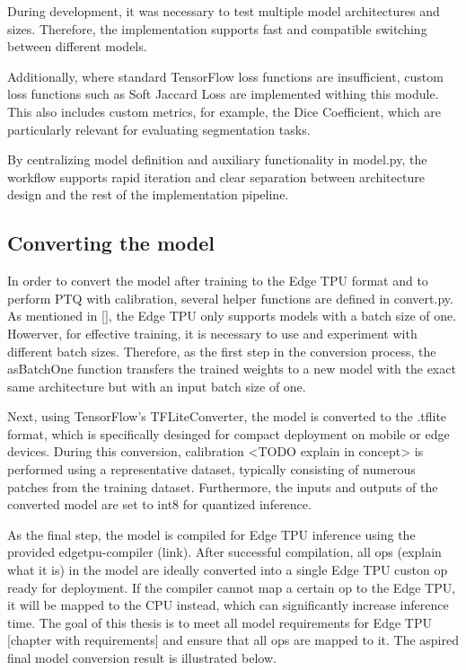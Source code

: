 {During development, it was necessary to test multiple model architectures and sizes. Therefore, the implementation supports fast and compatible switching between different models.

Additionally, where standard TensorFlow loss functions are insufficient, custom loss functions such as Soft Jaccard Loss are implemented withing this module. This also includes custom metrics, for example, the Dice Coefficient, which are particularly relevant for evaluating segmentation tasks.

By centralizing model definition and auxiliary functionality in model.py, the workflow supports rapid iteration and clear separation between architecture design and the rest of the implementation pipeline.


\subsection{Converting the model}

In order to convert the model after training to the Edge TPU format and to perform PTQ with calibration, several helper functions are defined in convert.py. As mentioned in [], the Edge TPU only supports models with a batch size of one. Howerver, for effective training, it is necessary to use and experiment with different batch sizes. Therefore, as the first step in the conversion process, the asBatchOne function transfers the trained weights to a new model with the exact same architecture but with an input batch size of one.

Next, using TensorFlow's TFLiteConverter, the model is converted to the .tflite format, which is specifically desinged for compact deployment on mobile or edge devices. During this conversion, calibration <TODO explain in concept> is performed using a representative dataset, typically consisting of numerous patches from the training dataset. Furthermore, the inputs and outputs of the converted model are set to int8 for quantized inference.

As the final step, the model is compiled for Edge TPU inference using the provided edgetpu-compiler (link). After successful compilation, all ops (explain what it is) in the model are ideally converted into a single Edge TPU custon op ready for deployment. If the compiler cannot map a certain op to the Edge TPU, it will be mapped to the CPU instead, which can significantly increase inference time. The goal of this thesis is to meet all model requirements for Edge TPU [chapter with requirements] and ensure that all ops are mapped to it. The aspired final model conversion result is illustrated below.


}